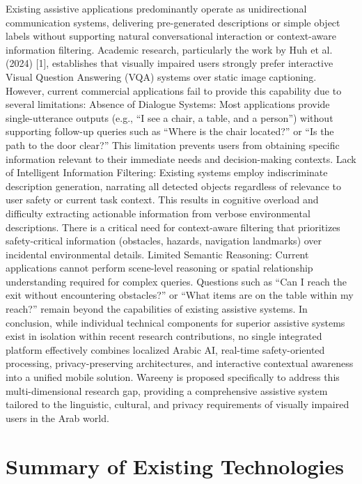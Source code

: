 \documentclass[12pt,a4paper]{report}
\begin{document}
Existing assistive applications predominantly operate as unidirectional communication systems, delivering pre-generated descriptions or simple object labels without supporting natural conversational interaction or context-aware information filtering. Academic research, particularly the work by Huh et al. (2024) [1], establishes that visually impaired users strongly prefer interactive Visual Question Answering (VQA) systems over static image captioning. However, current commercial applications fail to provide this capability due to several limitations: Absence of Dialogue Systems: Most applications provide single-utterance outputs (e.g., ``I see a chair, a table, and a person'') without supporting follow-up queries such as ``Where is the chair located?'' or ``Is the path to the door clear?'' This limitation prevents users from obtaining specific information relevant to their immediate needs and decision-making contexts. Lack of Intelligent Information Filtering: Existing systems employ indiscriminate description generation, narrating all detected objects regardless of relevance to user safety or current task context. This results in cognitive overload and difficulty extracting actionable information from verbose environmental descriptions. There is a critical need for context-aware filtering that prioritizes safety-critical information (obstacles, hazards, navigation landmarks) over incidental environmental details. Limited Semantic Reasoning: Current applications cannot perform scene-level reasoning or spatial relationship understanding required for complex queries. Questions such as ``Can I reach the exit without encountering obstacles?'' or ``What items are on the table within my reach?'' remain beyond the capabilities of existing assistive systems. In conclusion, while individual technical components for superior assistive systems exist in isolation within recent research contributions, no single integrated platform effectively combines localized Arabic AI, real-time safety-oriented processing, privacy-preserving architectures, and interactive contextual awareness into a unified mobile solution. Wareeny is proposed specifically to address this multi-dimensional research gap, providing a comprehensive assistive system tailored to the linguistic, cultural, and privacy requirements of visually impaired users in the Arab world.

\section{Summary of Existing Technologies}
\end{document}
